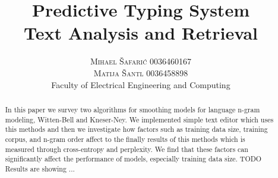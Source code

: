 \documentclass[twoside]{article}
\title{\vspace{-15mm}\fontsize{24pt}{10pt}\selectfont\textbf{Predictive Typing System \\ \fontsize{18pt}{10pt}\selectfont Text Analysis and Retrieval}} %
\author{
\large
\textsc{Mihael Šafarić 0036460167}\\\textsc{Matija Šantl 0036458898}\\
\normalsize Faculty of Electrical Engineering and Computing \\
\vspace{-5mm}
}
\date{}
\begin{document}
\maketitle %

\thispagestyle{fancy} %


\begin{abstract}
In this paper we survey two algorithms for smoothing models for language n-gram modeling, Witten-Bell and Kneser-Ney. We implemented simple text editor which uses this methods and then we investigate how factors such as training data size, training corpus, and n-gram order affect to the finally results of this methods which is measured through cross-entropy and perplexity. We find that these factors can significantly affect the performance of models, especially training data size. TODO Results are showing ...
\end{abstract}

\end{document}
